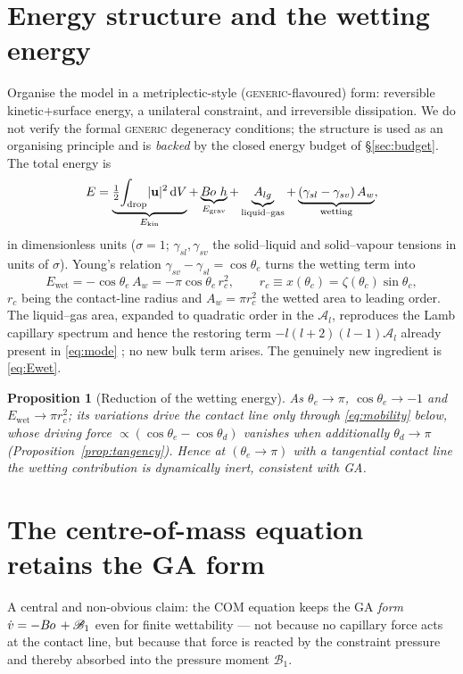 \documentclass{jfm}
\newcommand{\be}{\begin{equation}}
\newcommand{\ee}{\end{equation}}
\newcommand{\Bo}{B\kern-0.05em o\,}
\newtheorem{proposition}{Proposition}
\begin{document}
\section{Energy structure and the wetting energy}\label{sec:energy}

Organise the model in a metriplectic-style (\textsc{generic}-flavoured) form: reversible
kinetic$+$surface energy, a unilateral constraint, and irreversible dissipation. We do
not verify the formal \textsc{generic} degeneracy conditions; the structure is used as an
organising principle and is \emph{backed} by the closed energy budget of
\S\ref{sec:budget}. The total energy is
\be\label{eq:energy}
E=\underbrace{\tfrac12\!\int_{\text{drop}}\!|\mathbf u|^2\,\mathrm dV}_{E_{\text{kin}}}
 +\underbrace{\Bo\,h}_{E_{\text{grav}}}
 +\underbrace{A_{lg}}_{\text{liquid--gas}}
 +\underbrace{(\gamma_{sl}-\gamma_{sv})\,A_{w}}_{\text{wetting}},
\ee
in dimensionless units ($\sigma=1$; $\gamma_{sl},\gamma_{sv}$ the solid--liquid and
solid--vapour tensions in units of $\sigma$). Young's relation
$\gamma_{sv}-\gamma_{sl}=\cos\theta_e$ turns the wetting term into
\be\label{eq:Ewet}
E_{\text{wet}}=-\cos\theta_e\,A_w=-\pi\cos\theta_e\,r_c^{2},\qquad
r_c\equiv x(\theta_c)=\zeta(\theta_c)\sin\theta_c,
\ee
$r_c$ being the contact-line radius and $A_w=\pi r_c^2$ the wetted area to leading order.
The liquid--gas area, expanded to quadratic order in the $\mathscr A_l$, reproduces the
Lamb capillary spectrum and hence the restoring term $-l(l+2)(l-1)\mathscr A_l$ already
present in \eqref{eq:mode} \citep{Lamb1924}; no new bulk term arises. The genuinely new
ingredient is \eqref{eq:Ewet}.

\begin{proposition}[Reduction of the wetting energy]\label{prop:Ewet}
As $\theta_e\to\pi$, $\cos\theta_e\to-1$ and $E_{\text{wet}}\to\pi r_c^2$; its variations
drive the contact line only through \eqref{eq:mobility} below, whose driving force
$\propto(\cos\theta_e-\cos\theta_d)$ vanishes when additionally $\theta_d\to\pi$
(Proposition~\ref{prop:tangency}). Hence at $(\theta_e\to\pi)$ with a tangential contact
line the wetting contribution is dynamically inert, consistent with GA.
\end{proposition}

\section{The centre-of-mass equation retains the GA form}\label{sec:noforce}

A central and non-obvious claim: the COM equation keeps the GA \emph{form}
$\dot v=-\Bo+\mathscr B_1$ even for finite wettability --- not because no capillary
force acts at the contact line, but because that force is reacted by the constraint
pressure and thereby absorbed into the pressure moment $\mathscr B_1$.
\end{document}
